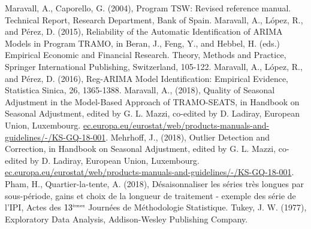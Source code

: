 \documentclass[12pt, a4paper, french]{article}
\begin{document}
\begin{thebibliography}{999}
 Maravall, A., Caporello, G. (2004), Program TSW: Revised reference manual. Technical Report, Research Department, Bank of Spain.
 Maravall, A., L\'{o}pez, R., and P\'{e}rez, D. (2015), Reliability of the Automatic Identification of ARIMA Models in Program TRAMO, in Beran, J., Feng, Y., and Hebbel, H. (eds.) Empirical Economic and Financial Research. Theory, Methods and Practice, Springer International Publishing, Switzerland, 105-122.
 Maravall, A., L\'{o}pez, R., and P\'{e}rez, D. (2016), Reg-ARIMA Model Identification: Empirical Evidence, Statistica Sinica, 26, 1365-1388.
 Maravall, A., (2018), Quality of Seasonal Adjustment in the Model-Based Approach of TRAMO-SEATS, in Handbook on Seasonal Adjustment, edited by G. L. Mazzi, co-edited by D. Ladiray, European Union, Luxembourg. \url{ec.europa.eu/eurostat/web/products-manuals-and-guidelines/-/KS-GQ-18-001}.
 Mehrhoff, J., (2018), Outlier Detection and Correction, in Handbook on Seasonal Adjustment, edited by G. L. Mazzi, co-edited by D. Ladiray, European Union, Luxembourg. \url{ec.europa.eu/eurostat/web/products-manuals-and-guidelines/-/KS-GQ-18-001}.
 Pham, H., Quartier-la-tente, A. (2018), Désaisonnaliser les séries très longues par sous-période, gains et choix de la longueur de traitement - exemple des série de l'IPI, Actes des $13^{\mbox{\tiny èmes}}$ Journées de Méthodologie Statistique. 
 Tukey, J. W. (1977), Exploratory Data Analysis, Addison-Wesley Publishing Company.





\end{thebibliography}

%
\end{document}
